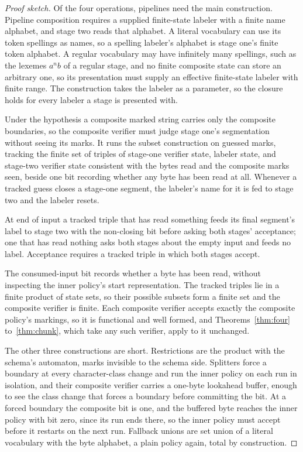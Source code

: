 \documentclass[11pt,a4paper]{article}
\theoremstyle{definition}
\theoremstyle{plain}
\begin{document}
\begin{proof}[Proof sketch]
Of the four operations, pipelines need the main construction. Pipeline composition requires a supplied finite-state
labeler with a finite name alphabet, and stage two reads that alphabet. A literal vocabulary can use its token spellings
as names, so a spelling labeler's alphabet is stage one's finite token alphabet. A regular vocabulary may have
infinitely many spellings, such as the lexemes $a^n b$ of a regular stage, and no finite composite state can store an
arbitrary one, so its presentation must supply an effective finite-state labeler with finite range. The construction
takes the labeler as a parameter, so the closure holds for every labeler a stage is presented with.

Under the hypothesis a composite marked string carries only the composite boundaries, so the composite verifier must
judge stage one's segmentation without seeing its marks. It runs the subset construction on guessed marks, tracking the
finite set of triples of stage-one verifier state, labeler state, and stage-two verifier state consistent with the bytes
read and the composite marks seen, beside one bit recording whether any byte has been read at all. Whenever a tracked
guess closes a stage-one segment, the labeler's name for it is fed to stage two and the labeler resets.

At end of input a tracked triple that has read something feeds its final segment's label to stage two with the
non-closing bit before asking both stages' acceptance; one that has read nothing asks both stages about the empty input
and feeds no label. Acceptance requires a tracked triple in which both stages accept.

The consumed-input bit records whether a byte has been read, without inspecting the inner policy's start representation.
The tracked triples lie in a finite product of state sets, so their possible subsets form a finite set and the composite
verifier is finite. Each composite verifier accepts exactly the composite policy's markings, so it is functional and
well formed, and Theorems~\ref{thm:four} to~\ref{thm:chunk}, which take any such verifier, apply to it unchanged.

The other three constructions are short. Restrictions are the product with the schema's automaton, marks invisible to
the schema side. Splitters force a boundary at every character-class change and run the inner policy on each run in
isolation, and their composite verifier carries a one-byte lookahead buffer, enough to see the class change that forces
a boundary before committing the bit. At a forced boundary the composite bit is one, and the buffered byte reaches the
inner policy with bit zero, since its run ends there, so the inner policy must accept before it restarts on the next
run. Fallback unions are set union of a literal vocabulary with the byte alphabet, a plain policy again, total by
construction.
\end{proof}
\end{document}
